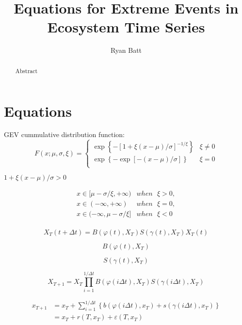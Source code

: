 \documentclass{article}
\title{Equations for Extreme Events in Ecosystem Time Series}
\author{Ryan Batt}
\begin{document}
\maketitle

\begin{abstract}
    Abstract
\end{abstract}

\section{Equations}

GEV cummulative distribution function:  
\[F\left( x;\mu ,\sigma ,\xi  \right)=\left\{ \begin{matrix}
   \exp \left\{ -{{[1+\xi (x-\mu )/\sigma ]}^{-1/\xi }} \right\} & \xi \ne 0  \\
   \exp \left\{ -\exp \left[ -(x-\mu )/\sigma  \right] \right\} & \xi =0  \\
\end{matrix} \right.\]

$1+\xi (x-\mu )/\sigma >0$

\[\begin{array}{*{35}{l}}
   x\in [\mu -\sigma /\xi ,+\infty ) & when\text{ }\xi >0,  \\
   x\in (-\infty ,+\infty ) & when\text{ }\xi =0,  \\
   x\in (-\infty ,\mu -\sigma /\xi ] & when\text{ }\xi <0  \\
\end{array}\]

\[{{X}_{T}}\left( t+\Delta t \right)=B\left( \varphi \left( t \right),{{X}_{T}} \right)S\left( \gamma \left( t \right),{{X}_{T}} \right){{X}_{T}}\left( t \right)\]

\[B\left( \varphi \left( t \right),{{X}_{T}} \right)\]

\[S\left( \gamma \left( t \right),{{X}_{T}} \right)\]

\[{{X}_{T+1}}={{X}_{T}}\prod\limits_{i=1}^{1/\Delta t}{B\left( \varphi \left( i\Delta t \right),{{X}_{T}} \right)S\left( \gamma \left( i\Delta t \right),{{X}_{T}} \right)}\]

\[\begin{array}{*{35}{l}}
   {{x}_{T+1}} & ={{x}_{T}}+\sum\limits_{i=1}^{1/\Delta t}{\left\{ b\left( \varphi \left( i\Delta t \right),{{x}_{T}} \right)+s\left( \gamma \left( i\Delta t \right),{{x}_{T}} \right) \right\}}  \\
   {} & ={{x}_{T}}+r\left( T,{{x}_{T}} \right)+\varepsilon \left( T,{{x}_{T}} \right)  \\
\end{array}\]
\end{document}
